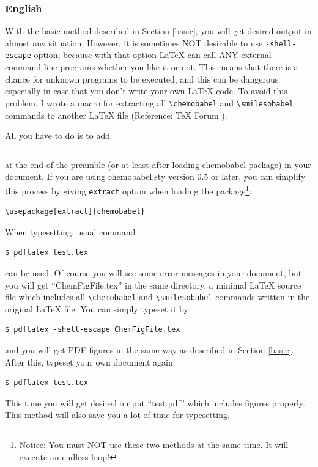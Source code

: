 \documentclass[12pt]{jsarticle}
\begin{document}
\subsubsection{English}

With the basic method described in Section \ref{basic}, you will get desired output in almost any situation.
However, it is sometimes NOT desirable to use \verb|-shell-escape| option,
because with that option {\LaTeX} can call ANY external command-line programs whether you like it or not.
This means that there is a chance for unknown programs to be executed,
and this can be dangerous especially in case that you don't write your own {\LaTeX} code.
To avoid this problem, I wrote a macro for extracting all \verb|\chemobabel| and \verb|\smilesobabel| commands to another {\LaTeX} file (Reference: {\TeX} Forum \cite{OKU}).

All you have to do is to add
\begin{verbatim}

\end{verbatim}
at the end of the preamble (or at least after loading \textsf{chemobabel} package) in your document.
If you are using \textsf{chemobabel.sty} version 0.5 or later, you can simplify this process by giving \verb|extract| option when loading the package\footnote{Notice: You must NOT use these two methods at the same time. It will execute an endless loop!}:
\begin{verbatim}
\usepackage[extract]{chemobabel}
\end{verbatim}
When typesetting, usual command
\begin{verbatim}
$ pdflatex test.tex
\end{verbatim}
can be used. Of course you will see some error messages in your document, but you will get ``ChemFigFile.tex'' in the same directory, a minimal {\LaTeX} source file which includes all \verb|\chemobabel| and \verb|\smilesobabel| commands written in the original {\LaTeX} file.
You can simply typeset it by
\begin{verbatim}
$ pdflatex -shell-escape ChemFigFile.tex
\end{verbatim}
and you will get PDF figures in the same way as described in Section \ref{basic}.
After this, typeset your own document again:
\begin{verbatim}
$ pdflatex test.tex
\end{verbatim}
This time you will get desired output ``test.pdf'' which includes figures properly.
This method will also save you a lot of time for typesetting.
\end{document}
